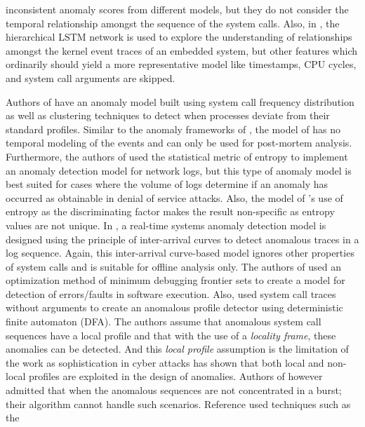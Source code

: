 inconsistent anomaly scores from different models, but they do not consider the 
temporal relationship amongst the sequence of the system calls. Also, in 
\cite{EzemeHaBAD,ezeme2019dream}, the hierarchical LSTM network is used to explore 
the 
understanding of relationships amongst the kernel event traces of an embedded 
system, but other features which ordinarily should yield a more representative 
model like timestamps, CPU cycles, and system call arguments are skipped.
\par 
Authors of \cite{yoon2017learning} have an anomaly model built using system 
call frequency distribution as well as clustering techniques to detect when 
processes deviate from their standard profiles. Similar to the anomaly frameworks of \cite{ezeme2017imputation,ezeme2020peskea}, the model of \cite{yoon2017learning} has no temporal modeling of the events and can only be used for post-mortem analysis. Furthermore, the authors of 
\cite{gu2005detecting} used the statistical metric of entropy to implement an 
anomaly detection model for network logs, but this type of anomaly model is 
best suited for cases where the volume of logs determine if an anomaly has 
occurred as obtainable in denial of service attacks. Also, the model of 
\cite{gu2005detecting}'s use of entropy as the discriminating factor makes the 
result non-specific as entropy values are not unique. In 
\cite{salem2016anomaly}, a real-time systems anomaly detection model is 
designed using the principle of inter-arrival curves to detect anomalous traces 
in a log sequence. Again, this inter-arrival curve-based model ignores 
other properties of system calls and is suitable for offline analysis only. The authors of \cite{li2017locating} used an 
optimization method of minimum debugging frontier sets to create a model for 
detection of errors/faults in software execution. Also, 
\cite{kosoresow1997intrusion} used 
system call traces without arguments to create an anomalous profile detector 
using deterministic finite automaton (DFA). The authors assume that anomalous 
system call sequences have a local profile and that with the use of a 
\emph{locality frame}, these anomalies can be detected. And this \emph{local profile} assumption is the limitation of the work as sophistication in cyber attacks has shown that both local and non-local profiles are exploited in the design of anomalies. Authors of 
\cite{kosoresow1997intrusion} however admitted that when the anomalous 
sequences are not concentrated in a burst; their algorithm cannot handle such 
scenarios. Reference \cite{warrender1999detecting} used techniques such as the 
